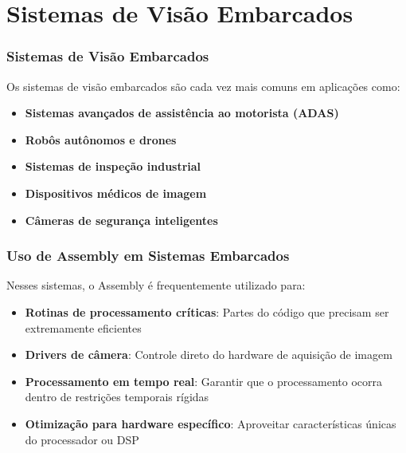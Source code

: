 \documentclass[11pt]{beamer}
\begin{document}
\section{Sistemas de Visão Embarcados}

\begin{frame}
\frametitle{Sistemas de Visão Embarcados}

Os sistemas de visão embarcados são cada vez mais comuns em aplicações como:

\begin{itemize}
    \item \textbf{Sistemas avançados de assistência ao motorista (ADAS)}
    \item \textbf{Robôs autônomos e drones}
    \item \textbf{Sistemas de inspeção industrial}
    \item \textbf{Dispositivos médicos de imagem}
    \item \textbf{Câmeras de segurança inteligentes}
\end{itemize}

\end{frame}

\begin{frame}
\frametitle{Uso de Assembly em Sistemas Embarcados}

Nesses sistemas, o Assembly é frequentemente utilizado para:

\begin{itemize}
    \item \textbf{Rotinas de processamento críticas}: Partes do código que precisam ser extremamente eficientes
    \item \textbf{Drivers de câmera}: Controle direto do hardware de aquisição de imagem
    \item \textbf{Processamento em tempo real}: Garantir que o processamento ocorra dentro de restrições temporais rígidas
    \item \textbf{Otimização para hardware específico}: Aproveitar características únicas do processador ou DSP
\end{itemize}

\end{frame}
\end{document}
